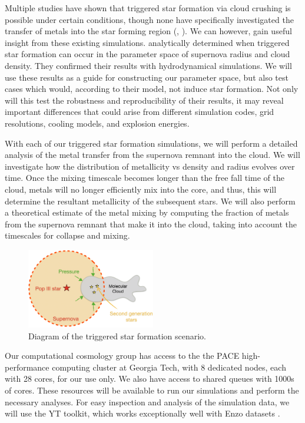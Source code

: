 \documentclass[a4paper, 12pt]{article}
\begin{document}
Multiple studies have shown that triggered star formation via cloud crushing is possible under certain conditions, though none have specifically investigated the transfer of metals into the star forming region (\cite{Melioli2006}, \cite{Leao2009}). We can however, gain useful insight from these existing simulations. \cite{Melioli2006} analytically determined when triggered star formation can occur in the parameter space of supernova radius and cloud density. They confirmed their results with hydrodynamical simulations. We will use these results as a guide for constructing our parameter space, but also test cases which would, according to their model, not induce star formation. Not only will this test the robustness and reproducibility of their results, it may reveal important differences that could arise from different simulation codes, grid resolutions, cooling models, and explosion energies.

With each of our triggered star formation simulations, we will perform a detailed analysis of the metal transfer from the supernova remnant into the cloud. We will investigate how the distribution of metallicity vs density and radius evolves over time. Once the mixing timescale becomes longer than the free fall time of the cloud, metals will no longer efficiently mix into the core, and thus, this will determine the resultant metallicity of the subsequent stars. \cite{...} We will also perform a theoretical estimate of the metal mixing by computing the fraction of metals from the supernova remnant that make it into the cloud, taking into account the timescales for collapse and mixing. 


\begin{figure}
  \caption{Diagram of the triggered star formation scenario.}
    \includegraphics[width=0.5\textwidth]{figures/tsf2}
\end{figure}

Our computational cosmology group has access to the the PACE high-performance computing cluster at Georgia Tech, with 8 dedicated nodes, each with 28 cores, for our use only. We also have access to shared queues with 1000s of cores. These resources will be available to run our simulations and perform the necessary analyses. For easy inspection and analysis of the simulation data, we will use the YT toolkit, which works exceptionally well with Enzo datasets \citep{Turk2011}.
\end{document}

